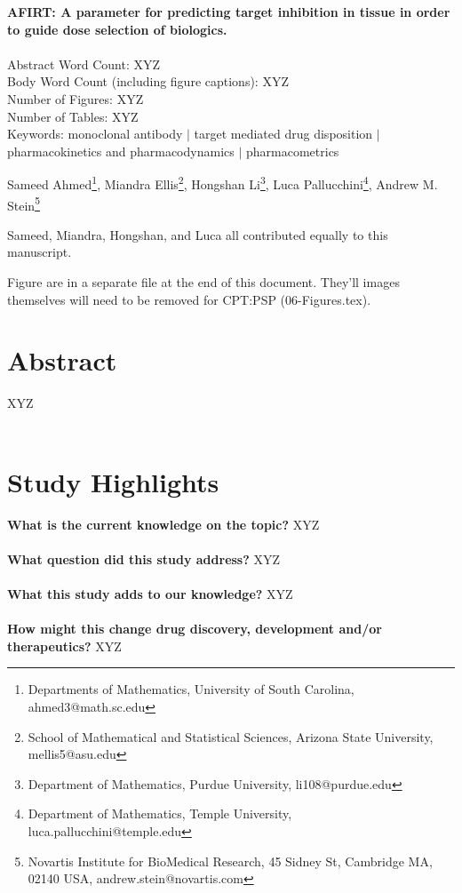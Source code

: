 \documentclass{article}
\date{}
\begin{document}
{\Large{\bf AFIRT:  A parameter for predicting target inhibition in tissue in order to guide dose selection of biologics.}} 
~
\\
\\
Abstract Word Count: XYZ
\\
Body Word Count (including figure captions): XYZ
\\
Number of Figures: XYZ 
\\
Number of Tables: XYZ
\\
Keywords: monoclonal antibody $|$ target mediated drug disposition $|$ pharmacokinetics and pharmacodynamics $|$ pharmacometrics

\bigskip

\def\thefootnote{\arabic{footnote}}
\begin{center}
    Sameed Ahmed\footnote{Departments of Mathematics, University of South Carolina, ahmed3@math.sc.edu},
    Miandra Ellis\footnote{School of Mathematical and Statistical Sciences, Arizona State University, mellis5@asu.edu},
    Hongshan Li\footnote{Department of Mathematics, Purdue University, li108@purdue.edu},
    Luca Pallucchini\footnote{Department of Mathematics, Temple University,  luca.pallucchini@temple.edu},
    Andrew M. Stein\footnote{Novartis Institute for BioMedical Research, 45 Sidney St, Cambridge MA, 02140 USA, andrew.stein@novartis.com}
\end{center}
Sameed, Miandra, Hongshan, and Luca all contributed equally to this manuscript.

\newpage

\tableofcontents

Figure are in a separate file at the end of this document.  They'll images themselves will need to be removed for CPT:PSP (06-Figures.tex). 

\section*{Abstract}
XYZ
\\
\\

\newpage







\section*{Study Highlights}
\textbf{What is the current knowledge on the topic?}
XYZ
\\ \\
\textbf{What question did this study address?}
XYZ
\\ \\
\textbf{What this study adds to our knowledge?}
XYZ
\\ \\
\textbf{How might this change drug discovery, development and/or therapeutics?}
XYZ
\end{document}
